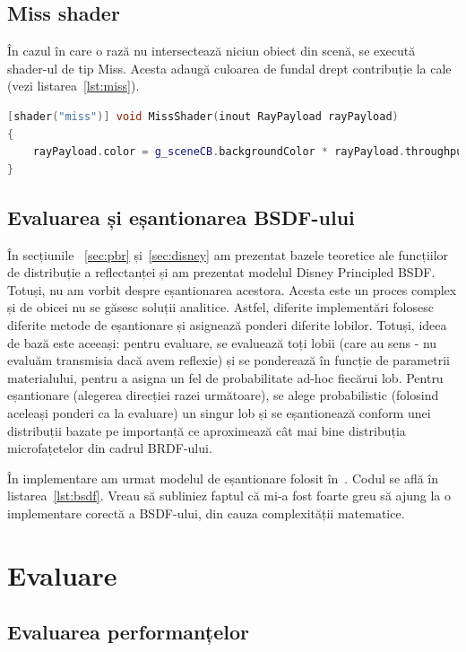 \documentclass[12pt,a4paper]{report}
\numberwithin{equation}{section} %
\begin{document}
\section{Miss shader}

În cazul în care o rază nu intersectează niciun obiect din scenă, se execută
shader-ul de tip Miss. Acesta adaugă culoarea de fundal drept contribuție la cale (vezi listarea~\ref{lst:miss}).
\begin{lstlisting}[caption={Shader-ul de tip Miss},label={lst:miss},language=C++]
[shader("miss")] void MissShader(inout RayPayload rayPayload)
{
	rayPayload.color = g_sceneCB.backgroundColor * rayPayload.throughput;
}
\end{lstlisting}

\section{Evaluarea și eșantionarea BSDF-ului}

În secțiunile ~\ref{sec:pbr} și~\ref{sec:disney} am prezentat bazele teoretice
ale funcțiilor de distribuție a reflectanței și am prezentat modelul Disney Principled
BSDF. Totuși, nu am vorbit despre eșantionarea acestora. Acesta este un proces complex
și de obicei nu se găsesc soluții analitice. Astfel, diferite implementări folosesc
diferite metode de eșantionare și asignează ponderi diferite lobilor. Totuși, ideea
de bază este aceeași: pentru evaluare, se evaluează toți lobii (care au sens - nu evaluăm
transmisia dacă avem reflexie) și se ponderează în funcție de parametrii materialului,
pentru a asigna un fel de probabilitate ad-hoc fiecărui lob. Pentru eșantionare
(alegerea direcției razei următoare), se alege probabilistic (folosind aceleași ponderi
ca la evaluare) un singur lob și se eșantionează conform unei distribuții bazate
pe importanță ce aproximează cât mai bine distribuția microfațetelor din cadrul BRDF-ului.

În implementare am urmat modelul de eșantionare folosit în~\cite{GlslPathTracer}.
Codul se află în listarea~\ref{lst:bsdf}. Vreau să subliniez faptul că mi-a fost foarte
greu să ajung la o implementare corectă a BSDF-ului, din cauza complexității matematice.

\chapter{\label{sec:evaluare}Evaluare}

\section{Evaluarea performanțelor}
\end{document}
